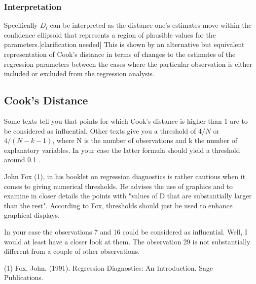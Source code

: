 \documentclass[Main.tex]{subfiles}
\begin{document}
	
	\subsubsection{Interpretation}
	Specifically $D_i$ can be interpreted as the distance one's estimates move within the confidence ellipsoid that represents a region of plausible values for the parameters.[clarification needed] This is shown by an alternative but equivalent representation of Cook's distance in terms of changes to the estimates of the regression parameters between the cases where the particular observation is either included or excluded from the regression analysis.
	
	\newpage
	
	
	\subsection{Cook's Distance}
	Some texts tell you that points for which Cook's distance is higher than 1 are to be considered as influential. Other texts give you a threshold of $4/N$ or $4/(N−k−1)$, where N is the number of observations and k the number of explanatory variables. In your case the latter formula should yield a threshold around 0.1 .
	
	John Fox (1), in his booklet on regression diagnostics is rather cautious when it comes to giving numerical thresholds. He advises the use of graphics and to examine in closer details the points with "values of D that are substantially larger than the rest". According to Fox, thresholds should just be used to enhance graphical displays.
	
	In your case the observations 7 and 16 could be considered as influential. Well, I would at least have a closer look at them. The observation 29 is not substantially different from a couple of other observations.
	
	(1) Fox, John. (1991). Regression Diagnostics: An Introduction. Sage Publications.
	
\end{document}
